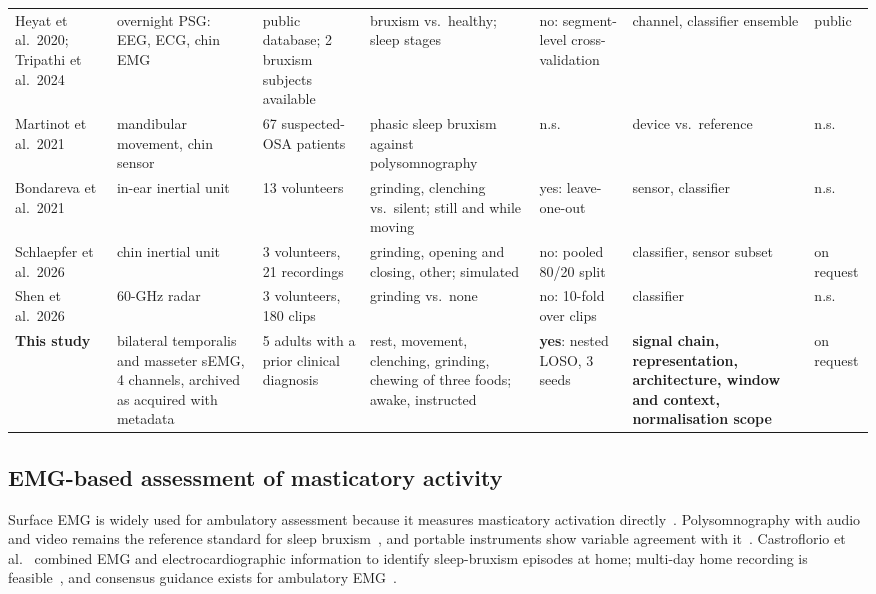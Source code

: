 \documentclass[pdflatex,sn-nature,iicol]{sn-jnl}
\begin{document}
\begin{table}[h]
\begin{tabular*}{\textwidth}{@{\extracolsep{\fill}}p{}p{}p{}p{}p{}p{}p{}@{}}
    Heyat et al.\ 2020; Tripathi et al.\ 2024~\cite{heyat2020computational,tripathi2024computational} & overnight PSG: EEG, ECG, chin EMG & public database; 2 bruxism subjects available & bruxism vs.\ healthy; sleep stages & no: segment-level cross-validation & channel, classifier ensemble & public \\
    Martinot et al.\ 2021~\cite{martinot2021artificial} & mandibular movement, chin sensor & 67 suspected-OSA patients & phasic sleep bruxism against polysomnography & n.s. & device vs.\ reference & n.s. \\
    Bondareva et al.\ 2021~\cite{bondareva2021earables} & in-ear inertial unit & 13 volunteers & grinding, clenching vs.\ silent; still and while moving & yes: leave-one-out & sensor, classifier & n.s. \\
    Schlaepfer et al.\ 2026~\cite{schlaepfer2026new} & chin inertial unit & 3 volunteers, 21 recordings & grinding, opening and closing, other; simulated & no: pooled 80/20 split & classifier, sensor subset & on request \\
    Shen et al.\ 2026~\cite{shen2026bruxism} & 60-GHz radar & 3 volunteers, 180 clips & grinding vs.\ none & no: 10-fold over clips & classifier & n.s. \\
    \midrule
    \textbf{This study} & bilateral temporalis and masseter sEMG, 4 channels, archived as acquired with metadata & 5 adults with a prior clinical diagnosis & rest, movement, clenching, grinding, chewing of three foods; awake, instructed & \textbf{yes}: nested LOSO, 3 seeds & \textbf{signal chain, representation, architecture, window and context, normalisation scope} & on request \\
    \bottomrule
  \end{tabular*}
\end{table}


\subsection{EMG-based assessment of masticatory activity}

Surface EMG is widely used for ambulatory assessment because it measures masticatory activation directly~\cite{raez2006techniques,farella2008masticatory}. Polysomnography with audio and video remains the reference standard for sleep bruxism~\cite{lavigne1996sleep,stuginski2016detection}, and portable instruments show variable agreement with it~\cite{casett2017validity,cidverdejo2024instrumental}. Castroflorio et al.~\cite{castroflorio2013use,castroflorio2014detection} combined EMG and electrocardiographic information to identify sleep-bruxism episodes at home; multi-day home recording is feasible~\cite{colonna2023electromyographic}, and consensus guidance exists for ambulatory EMG~\cite{lobbezoo2020consensus}.
\end{document}
